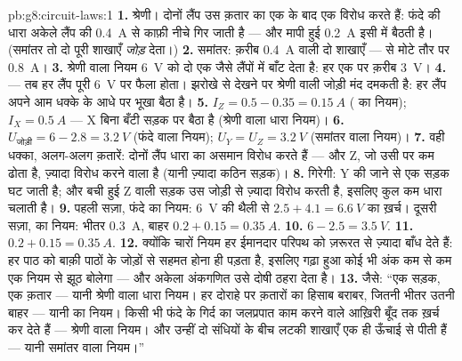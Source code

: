 \begin{solution}{pb:g8:circuit-laws:1}
\textbf{1.} श्रेणी।  दोनों लैंप उस क़तार का एक के बाद एक
विरोध करते हैं: फंदे की धारा अकेले लैंप की \qty{0.4}{A} से काफ़ी नीचे
गिर जाती है --- और मापी हुई \qty{0.2}{A} इसी में बैठती है। (समांतर तो
दो पूरी शाखाएँ \emph{जोड़} देता।)
\textbf{2.} समांतर: क़रीब \qty{0.4}{A} वाली दो शाखाएँ --- 
से मोटे तौर पर \qty{0.8}{A}।
\textbf{3.} श्रेणी वाला  नियम \qty{6}{V} को दो एक जैसे लैंपों
में बाँट देता है: हर एक पर क़रीब \qty{3}{V}।
\textbf{4.}  --- तब हर लैंप पूरी \qty{6}{V} पर फैला होता।
झरोखे से देखने पर श्रेणी वाली जोड़ी मंद दमकती है: हर लैंप अपने आम
धक्के के आधे पर भूखा बैठा है।
\textbf{5.} $I_Z = 0.5 - 0.35 = \qty{0.15}{A}$ ( का नियम);
$I_X = \qty{0.5}{A}$ --- X बिना बँटी सड़क पर बैठा है (श्रेणी वाला धारा
नियम)।
\textbf{6.} $U_{\text{जोड़ी}} = 6 - 2.8 = \qty{3.2}{V}$ (फंदे वाला
नियम); $U_Y = U_Z = \qty{3.2}{V}$ (समांतर वाला नियम)।
\textbf{7.} वही धक्का, अलग-अलग क़तारें: दोनों लैंप धारा का असमान
विरोध करते हैं --- और Z, जो उसी  पर कम ढोता है, ज़्यादा विरोध
करने वाला है (यानी ज़्यादा कठिन सड़क)।
\textbf{8.} गिरेगी: Y की  जाने से एक सड़क घट जाती है; और बची हुई
Z वाली सड़क उस जोड़ी से ज़्यादा विरोध करती है, इसलिए  कुल कम धारा
चलाती है।
\textbf{9.} पहली सज़ा, फंदे का नियम: \qty{6}{V} की थैली से
$2.5 + 4.1 = \qty{6.6}{V}$ का ख़र्च। दूसरी सज़ा,  का नियम: भीतर
\qty{0.3}{A}, बाहर $0.2 + 0.15 = \qty{0.35}{A}$.
\textbf{10.} $6 - 2.5 = \qty{3.5}{V}$.
\textbf{11.} $0.2 + 0.15 = \qty{0.35}{A}$.
\textbf{12.} क्योंकि चारों नियम हर ईमानदार परिपथ को ज़रूरत से
ज़्यादा बाँध देते हैं: हर पाठ को बाक़ी पाठों के जोड़ों से सहमत होना ही
पड़ता है, इसलिए गढ़ा हुआ कोई भी अंक कम से कम एक नियम से झूठ बोलेगा ---
और अकेला अंकगणित उसे दोषी ठहरा देता है।
\textbf{13.} जैसे: ``एक सड़क, एक क़तार --- यानी श्रेणी वाला धारा
नियम। हर दोराहे पर क़तारों का हिसाब बराबर, जितनी भीतर उतनी बाहर ---
यानी  का नियम। किसी भी फंदे के गिर्द  का जलप्रपात काम करने
वाले आख़िरी बूँद तक ख़र्च कर देते हैं --- श्रेणी वाला 
नियम। और उन्हीं दो संधियों के बीच लटकी शाखाएँ एक ही ऊँचाई से पीती हैं
--- यानी समांतर वाला  नियम।''
\end{solution}
